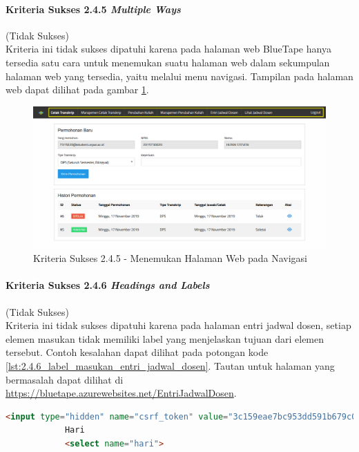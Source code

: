 \documentclass[a4paper,twoside]{article}
\begin{document}
\begin{enumerate}
		\paragraph{Kriteria Sukses 2.4.5 \textit{Multiple Ways}}
		\label{par:kepatuhan_bluetape_kriteria_sukses_2.4.5}
		(Tidak Sukses)\\

		Kriteria ini tidak sukses dipatuhi karena pada halaman web BlueTape hanya tersedia satu cara untuk menemukan suatu halaman web dalam sekumpulan halaman web yang tersedia, yaitu melalui menu navigasi. Tampilan pada halaman web dapat dilihat pada gambar \ref{fig:2.4.5_multiple_ways}.

		\begin{figure}[H]
			\centering  
			\includegraphics[scale=0.3, frame]{kriteria-sukses-2-4-5-multiple-ways}  
			\caption[Kriteria Sukses 2.4.5 - Menemukan Halaman Web pada Navigasi]{Kriteria Sukses 2.4.5 - Menemukan Halaman Web pada Navigasi}
			\label{fig:2.4.5_multiple_ways}  
		\end{figure}

		\paragraph{Kriteria Sukses 2.4.6 \textit{Headings and Labels}}
		\label{par:kepatuhan_bluetape_kriteria_sukses_2.4.6}
		(Tidak Sukses)\\

		Kriteria ini tidak sukses dipatuhi karena pada halaman entri jadwal dosen, setiap elemen masukan tidak memiliki label yang menjelaskan tujuan dari elemen tersebut. Contoh kesalahan dapat dilihat pada potongan kode \ref{lst:2.4.6_label_masukan_entri_jadwal_dosen}. Tautan untuk halaman yang bermasalah dapat dilihat di \url{https://bluetape.azurewebsites.net/EntriJadwalDosen}.

		\begin{lstlisting}[frame=single, label={lst:2.4.6_label_masukan_entri_jadwal_dosen}, language=HTML, caption=Kriteria Sukses 2.4.6 - Tidak Terdapat Label pada Kolom Masukan di Halaman Entri Jadwal Dosen]
			<input type="hidden" name="csrf_token" value="3c159eae7bc953dd591b679c080ed066"/>
			Hari
			<select name="hari">
		\end{lstlisting}
		

\end{enumerate}
\end{document}
